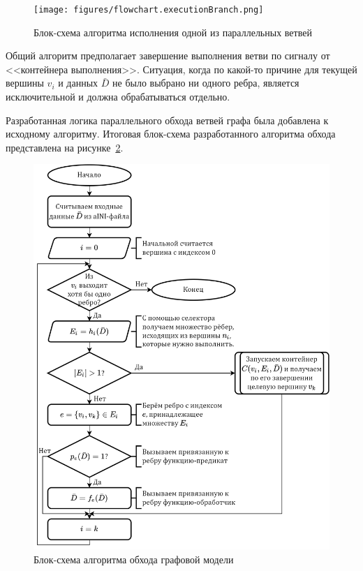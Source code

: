 \begin{figure}[!ht]
    \centering
    \texttt{[image: figures/flowchart.executionBranch.png]}
    \caption{Блок-схема алгоритма исполнения одной из параллельных ветвей}
    \label{fig:flowchartExecutionBranch}
\end{figure}

Общий алгоритм предполагает завершение выполнения ветви по сигналу от <<контейнера выполнения>>. Ситуация, когда по какой-то причине для текущей вершины $v_i$ и данных $\bar{D}$ не было выбрано ни одного ребра, является исключительной и должна обрабатываться отдельно.

Разработанная логика параллельного обхода ветвей графа была добавлена к исходному алгоритму. Итоговая блок-схема разработанного алгоритма обхода представлена на рисунке~\ref{fig:flowchartFinal}.

\begin{figure}[!ht]
    \centering
    \includegraphics[height=0.6\textheight]{figures/flowchart.graphRunning2.png}
    \caption{Блок-схема алгоритма обхода графовой модели}
    \label{fig:flowchartFinal}
\end{figure}

